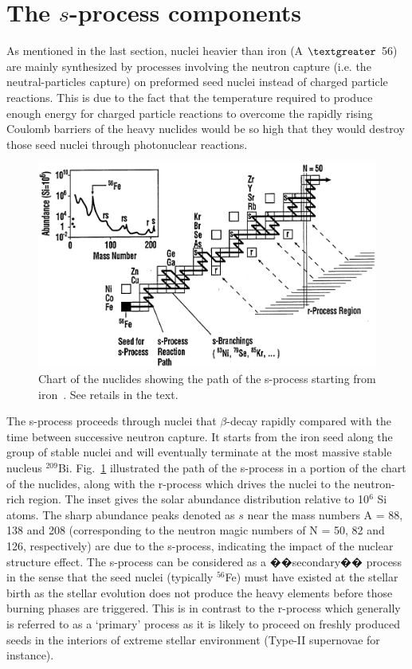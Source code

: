 \section{The $s$-process components}

As mentioned in the last section,  nuclei heavier than iron (A $\textgreater$ 56) are mainly synthesized by processes involving the neutron capture (i.e. the neutral-particles capture) on preformed seed nuclei instead of charged particle reactions. This is due to the fact that the temperature required to produce enough energy for charged particle reactions to overcome the rapidly rising Coulomb barriers of the heavy nuclides would be so high that they would destroy those seed nuclei through photonuclear reactions\citep{Boyd}.%


\begin{figure}[tpb]
  \begin{center}
    \centerline{\includegraphics[scale=0.5]{graph/ch1/n-cap}}
    \caption{Chart of the nuclides showing the path of the s-process starting from  iron~\citep{Kappeler2011}. See retails in the text.}
    \label{fig:n-cap}
  \end{center}
\end{figure}

The s-process proceeds through nuclei that $\beta$-decay rapidly compared with the time between successive neutron capture.  It starts from the iron seed along the group of stable nuclei and will eventually terminate at the most massive stable nucleus $^{209}$Bi. Fig.~\ref{fig:n-cap} illustrated the path of the s-process in a portion of the chart of the nuclides, along with the r-process which  drives the nuclei to the neutron-rich region. 
The inset gives the solar abundance distribution relative to 10$^6$ Si atoms. The sharp abundance peaks denoted as $s$  near the mass numbers A = 88, 138 and 208 (corresponding to the neutron magic numbers of N = 50, 82 and 126, respectively) are due to the s-process,  indicating  the impact of the nuclear structure effect.
The s-process can be considered as a ��secondary�� process
in the sense that the seed nuclei (typically $^{56}$Fe) must have existed at the stellar birth as the stellar evolution does not produce the heavy elements before those burning phases are triggered. This is in contrast to  the r-process which generally is referred to as a `primary' process as it is likely to proceed on freshly produced seeds in the interiors of extreme stellar environment (Type-II supernovae for instance).


